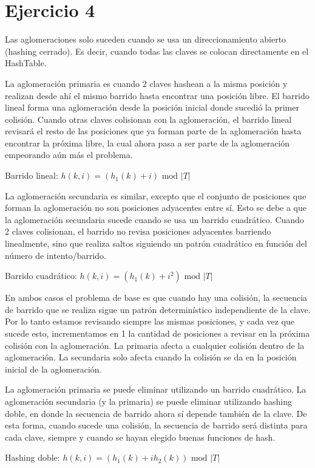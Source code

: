 \section*{Ejercicio 4}

Las aglomeraciones solo suceden cuando se usa un direccionamiento abierto (hashing cerrado). Es decir, cuando todas las claves se colocan directamente en el HashTable.

La aglomeración primaria es cuando 2 claves hashean a la misma posición y realizan desde ahí el mismo barrido hasta encontrar una posición libre. El barrido lineal forma una aglomeración desde la posición inicial donde sucedió la primer colisión. Cuando otras claves colisionan con la aglomeración, el barrido lineal revisará el resto de las posiciones que ya forman parte de la aglomeración hasta encontrar la próxima libre, la cual ahora pasa a ser parte de la aglomeración empeorando aún más el problema.

Barrido lineal: $h(k, i) = (h_1(k) + i) \text{ mod } |T|$

La aglomeración secundaria es similar, excepto que el conjunto de posiciones que forman la aglomeración no son posiciones adyacentes entre sí. Esto se debe a que la aglomeración secundaria sucede cuando se usa un barrido cuadrático. Cuando 2 claves colisionan, el barrido no revisa posiciones adyacentes barriendo linealmente, sino que realiza saltos siguiendo un patrón cuadrático en función del número de intento/barrido.

Barrido cuadrático: $h(k, i) = (h_1(k) + i^2) \text{ mod } |T|$

En ambos casos el problema de base es que cuando hay una colisión, la secuencia de barrido que se realiza sigue un patrón determinístico independiente de la clave. Por lo tanto estamos revisando siempre las mismas posiciones, y cada vez que sucede esto, incrementamos en 1 la cantidad de posiciones a revisar en la próxima colisión con la aglomeración. La primaria afecta a cualquier colisión dentro de la aglomeración. La secundaria solo afecta cuando la colisión se da en la posición inicial de la aglomeración.

La aglomeración primaria se puede eliminar utilizando un barrido cuadrático. La aglomeración secundaria (y la primaria) se puede eliminar utilizando hashing doble, en donde la secuencia de barrido ahora sí depende también de la clave. De esta forma, cuando sucede una colisión, la secuencia de barrido será distinta para cada clave, siempre y cuando se hayan elegido buenas funciones de hash.

Hashing doble: $h(k, i) = (h_1(k) + i h_2(k)) \text{ mod } |T|$
